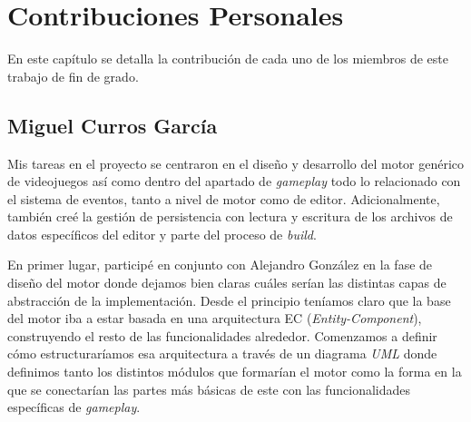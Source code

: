 \chapter{Contribuciones Personales}
\label{cap:contribucionesPersonales}



\begin{resumen}
En este capítulo se detalla la contribución de cada uno de los miembros de este trabajo de fin de grado.
\end{resumen}

\section*{Miguel Curros García}
Mis tareas en el proyecto se centraron en el diseño y desarrollo del motor genérico de videojuegos así como dentro del apartado de \textit{gameplay} todo lo relacionado con el sistema de eventos, tanto a nivel de motor como de editor. Adicionalmente, también creé la gestión de persistencia con lectura y escritura de los archivos de datos específicos del editor y parte del proceso de \textit{build}.

\medskip

En primer lugar, participé en conjunto con Alejandro González en la fase de diseño del motor donde dejamos bien claras cuáles serían las distintas capas de abstracción de la implementación. Desde el principio teníamos claro que la base del motor iba a estar basada en una arquitectura EC (\textit{Entity-Component}), construyendo el resto de las funcionalidades alrededor. Comenzamos a definir cómo estructuraríamos esa arquitectura a través de un diagrama \textit{UML} donde definimos tanto los distintos módulos que formarían el motor como la forma en la que se conectarían las partes más básicas de este con las funcionalidades específicas de \textit{gameplay}.

\medskip
 
